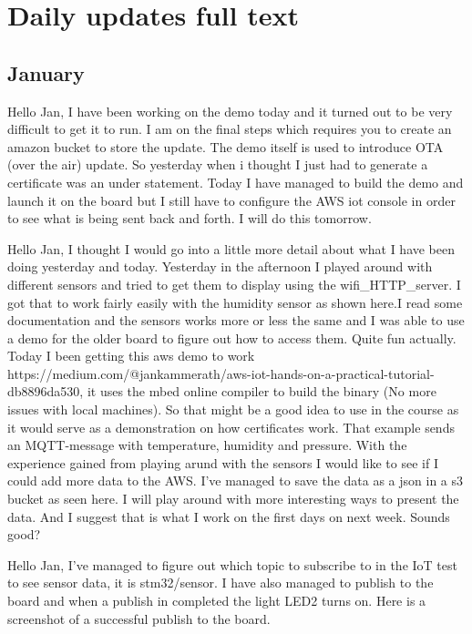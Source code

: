 \section{Daily updates full text}
 
\subsection{January}
Hello Jan,
I have been working on the demo today and it turned out to be very difficult to get it to run. I am on the final steps which requires you to create an amazon bucket to 
store the update. The demo itself is used to  introduce OTA (over the air) update. So yesterday when i thought I just had to generate a certificate was an under statement. 
Today I have managed to build the demo and 
launch it on the board but I still have to configure the AWS iot console in order to see what is being sent back and forth. I will do this tomorrow. 

Hello Jan,
I thought I would go into a little more detail about what I have been doing yesterday and today. Yesterday in the afternoon I played around 
with different sensors and tried to get
them to display using the wifi_HTTP_server. I got that to work fairly easily with the humidity sensor as shown here.I read some documentation and the sensors works more or 
less the 
same and I was able to use a demo for the older board to figure out how to access them.
Quite fun actually.
Today I been getting this aws demo to work https://medium.com/@jankammerath/aws-iot-hands-on-a-practical-tutorial-db8896da530, it uses the mbed online compiler to build the binary 
(No more issues with local machines). So that might be a good idea to use in 
the course as it would serve as a demonstration on how certificates work. That example sends an MQTT-message with temperature, 
humidity and pressure. With the experience gained from playing arund with the sensors I would like to see if 
I could add more data to the AWS. I've managed to save the data as a json in a s3 bucket as seen here.
I will play around with more interesting ways to present the data. And I suggest that is what I work on the first days on next week. Sounds good?

Hello Jan,
I've managed to figure out which topic to subscribe to in the IoT test to see sensor data, it is stm32/sensor. 
I have also managed to publish to the board and when a publish in completed the light LED2 turns on.
Here is a screenshot of a successful publish to the board.

